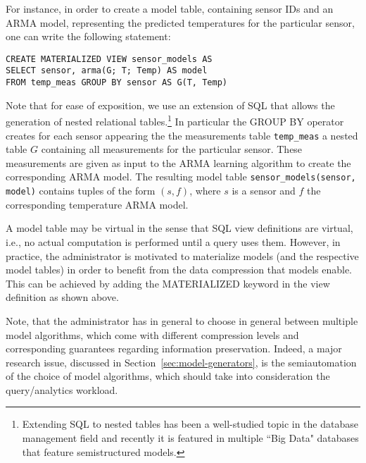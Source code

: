 \vspace*{0.5cm}
\begin{example}
\label{xmpl:models-and-definitions}
For instance, in order to create a model table, containing sensor IDs and an ARMA model, representing the predicted temperatures for the particular sensor, one can write the following statement:

\begin{verbatim}
CREATE MATERIALIZED VIEW sensor_models AS 
SELECT sensor, arma(G; T; Temp) AS model
FROM temp_meas GROUP BY sensor AS G(T, Temp)
\end{verbatim}

Note that for ease of exposition, we use an extension of SQL that allows the generation of nested relational tables.\footnote{Extending SQL to nested tables has been a well-studied topic in the database management field and recently it is featured in multiple ``Big Data" databases that feature semistructured models. 
}
In particular the GROUP BY operator creates for each sensor appearing the the measurements table \texttt{temp\_meas} a nested table $G$ containing all measurements for the particular sensor. These measurements are given as input to the ARMA learning algorithm to create the corresponding ARMA model.
The resulting model table \texttt{sensor\_models(sensor, model)} contains tuples of the form $(s, f)$, where $s$ is a sensor and $f$ the corresponding temperature ARMA model.
\end{example}
\vspace*{0.5cm}

A model table may be virtual in the sense that SQL view definitions are virtual, i.e., no actual computation is performed until a query uses them. However, in practice, the administrator is motivated to materialize models (and the  respective model tables) in order to benefit from the data compression that models enable. This can be achieved by adding the MATERIALIZED keyword in the view definition as shown above.

Note, that the administrator has in general to choose in general between multiple model algorithms, which come with different compression levels and corresponding guarantees regarding information preservation. Indeed, a major research issue, discussed in Section~\ref{sec:model-generators}, is the semiautomation of the choice of model algorithms, which should take into consideration the query/analytics workload.

